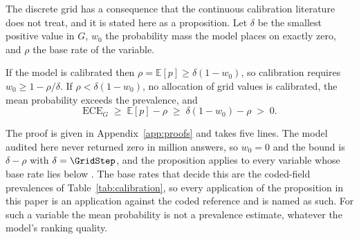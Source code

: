 The discrete grid has a consequence that the continuous calibration literature does not
treat, and it is stated here as a proposition. Let $\delta$ be the smallest positive value in
$G$, $w_0$ the probability mass the model places on exactly zero, and $\rho$ the base rate of
the variable.

\begin{proposition}
\label{prop:floor}
If the model is calibrated then $\rho = \mathbb{E}[p] \ge \delta(1 - w_0)$, so calibration
requires $w_0 \ge 1 - \rho/\delta$. If $\rho < \delta(1 - w_0)$, no allocation of grid values
is calibrated, the mean probability exceeds the prevalence, and
\begin{equation}
\mathrm{ECE}_G \;\ge\; \mathbb{E}[p] - \rho \;\ge\; \delta(1 - w_0) - \rho \;>\; 0.
\label{eq:floor}
\end{equation}
\end{proposition}

The proof is given in Appendix~\ref{app:proofs} and takes five lines. The model audited here
never returned zero in \NGridAnswersMillions{} million answers, so $w_0 = 0$ and the bound is
$\delta - \rho$ with $\delta = \GridStep$, and the proposition applies to every variable whose
base rate lies below \GridStep. The base rates that decide this are the coded-field
prevalences of Table~\ref{tab:calibration}, so every application of the proposition in this
paper is an application against the coded reference and is named as such. For such a variable
the mean probability is not a prevalence estimate, whatever the model's ranking quality.

